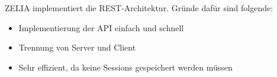
ZELIA implementiert die REST-Architektur. Gründe dafür sind folgende: 

\begin{itemize}
    \item Implementierung der API einfach und schnell
    \item Trennung von Server und Client 
    \item Sehr effizient, da keine Sessions gespeichert werden müssen 
\end{itemize}
\cite{WikiREST}